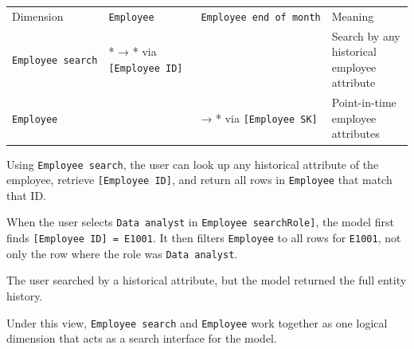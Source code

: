 \documentclass[10pt,openany,10pt]{book}
\newcounter{none}
\let\podeToprule\toprule
\let\podeMidrule\midrule
\let\podeBottomrule\bottomrule
\renewcommand{\toprule}{\arrayrulecolor{pbiGrid}\podeToprule}
\renewcommand{\midrule}{\arrayrulecolor{pbiGrid}\podeMidrule}
\renewcommand{\bottomrule}{\arrayrulecolor{pbiGrid}\podeBottomrule}
\begin{document}
{\def\LTcaptype{none} %
\begin{longtable}[]{@{}
  >{\raggedright\arraybackslash}p{}
  >{\raggedright\arraybackslash}p{}
  >{\raggedright\arraybackslash}p{}
  >{\raggedright\arraybackslash}p{}@{}}
\toprule\noalign{}
\begin{minipage}[b]{\linewidth}\raggedright
Dimension
\end{minipage} & \begin{minipage}[b]{\linewidth}\raggedright
\texttt{\textquotesingle{}Employee\textquotesingle{}}
\end{minipage} & \begin{minipage}[b]{\linewidth}\raggedright
\texttt{\textquotesingle{}Employee\ end\ of\ month\textquotesingle{}}
\end{minipage} & \begin{minipage}[b]{\linewidth}\raggedright
Meaning
\end{minipage} \\
\midrule\noalign{}
\endhead
\bottomrule\noalign{}
\endlastfoot
\texttt{\textquotesingle{}Employee\ search\textquotesingle{}} & * → *
via \texttt{{[}Employee\ ID{]}} & & Search by any historical employee
attribute \\
\texttt{\textquotesingle{}Employee\textquotesingle{}} & & 1 → * via
\texttt{{[}Employee\ SK{]}} & Point-in-time employee attributes \\
\end{longtable}
}

Using \texttt{\textquotesingle{}Employee\ search\textquotesingle{}}, the
user can look up any historical attribute of the employee, retrieve
\texttt{{[}Employee\ ID{]}}, and return all rows in
\texttt{\textquotesingle{}Employee\textquotesingle{}} that match that
ID.

When the user selects \texttt{Data\ analyst} in
\texttt{\textquotesingle{}Employee\ search\textquotesingle{}{[}Role{]}},
the model first finds \texttt{{[}Employee\ ID{]}\ =\ E1001}. It then
filters \texttt{\textquotesingle{}Employee\textquotesingle{}} to all
rows for \texttt{E1001}, not only the row where the role was
\texttt{Data\ analyst}.

The user searched by a historical attribute, but the model returned the
full entity history.

Under this view,
\texttt{\textquotesingle{}Employee\ search\textquotesingle{}} and
\texttt{\textquotesingle{}Employee\textquotesingle{}} work together as
one logical dimension that acts as a search interface for the model.
\end{document}
